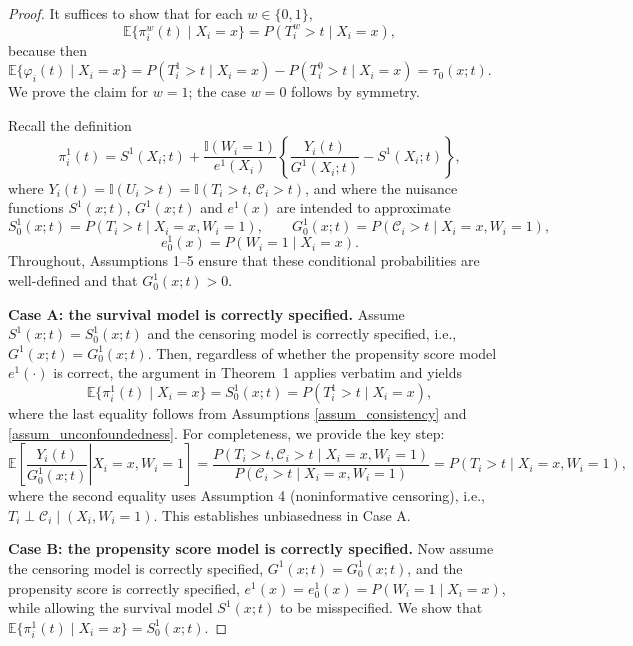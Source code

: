\documentclass{article}
\newenvironment{proofof}[1]
{\renewcommand{\proofname}{Proof of #1}\begin{proof}}
{\end{proof}}
\begin{document}
 \begin{proofof} {Theorem~\ref{thm:DR}:}
It suffices to show that for each $w\in\{0,1\}$,
\[
\mathbb{E}\{\pi_i^w(t)\mid X_i=x\}=P(T_i^w>t\mid X_i=x),
\]
because then
\(
\mathbb{E}\{\varphi_i(t)\mid X_i=x\}
=
P(T_i^1>t\mid X_i=x)-P(T_i^0>t\mid X_i=x)
=
\tau_0(x;t).
\)
We prove the claim for $w=1$; the case $w=0$ follows by symmetry.

Recall the definition
\[
\pi_i^1(t)
=
S^1(X_i;t)
+
\frac{\mathbb{I}(W_i=1)}{e^1(X_i)}
\left\{
\frac{Y_i(t)}{G^1(X_i;t)}-S^1(X_i;t)
\right\},
\]
where $Y_i(t)=\mathbb{I}(U_i>t)=\mathbb{I}(T_i>t,\,\mathcal C_i>t)$, and where the nuisance functions
$S^1(x;t)$, $G^1(x;t)$ and $e^1(x)$ are intended to approximate
\[
S_0^1(x;t)=P(T_i>t\mid X_i=x,W_i=1),\qquad
G_0^1(x;t)=P(\mathcal C_i>t\mid X_i=x,W_i=1),
\]
\[
e_0^1(x)=P(W_i=1\mid X_i=x).
\]
Throughout, Assumptions 1--5 ensure that these conditional probabilities are well-defined and that $G_0^1(x;t)>0$.

\medskip

\noindent \textbf{Case A: the survival model is correctly specified.}
Assume $S^1(x;t)=S_0^1(x;t)$ and the censoring model is correctly specified, i.e., $G^1(x;t)=G_0^1(x;t)$.
Then, regardless of whether the propensity score model $e^1(\cdot)$ is correct,
the argument in Theorem~1 applies verbatim and yields
\[
\mathbb{E}\{\pi_i^1(t)\mid X_i=x\}=S_0^1(x;t)=P(T_i^1>t\mid X_i=x),
\]
where the last equality follows from Assumptions \ref{assum_consistency}  and \ref{assum_unconfoundedness}.
For completeness, we provide the key step:
\[
\mathbb{E}\!\left[\left.\frac{Y_i(t)}{G_0^1(x;t)}\right|X_i=x,W_i=1\right]
=
\frac{P(T_i>t,\mathcal C_i>t\mid X_i=x,W_i=1)}{P(\mathcal C_i>t\mid X_i=x,W_i=1)}
=
P(T_i>t\mid X_i=x,W_i=1),
\]
where the second equality uses Assumption 4 (noninformative censoring), i.e.,
$T_i\perp \mathcal C_i\mid (X_i,W_i=1)$.
This establishes unbiasedness in Case A.

\medskip

\noindent \textbf{Case B: the propensity score model is correctly specified.}
Now assume the censoring model is correctly specified, $G^1(x;t)=G_0^1(x;t)$, and the propensity score is correctly specified,
$e^1(x)=e_0^1(x)=P(W_i=1\mid X_i=x)$, while allowing the survival model $S^1(x;t)$ to be misspecified.
We show that $\mathbb{E}\{\pi_i^1(t)\mid X_i=x\}=S_0^1(x;t)$.


\end{proofof}
\end{document}
